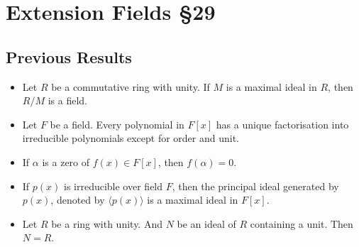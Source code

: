 



\section{Extension Fields \S29}
\subsection*{Previous Results}
\begin{itemize}
	\item Let $R$ be a commutative ring with unity. If $M$ is a maximal ideal in $R$, then $R/M$ is a field. \cite[\S27.9]{fraleigh}
	\item Let $F$ be a field. Every polynomial in $F[x]$ has a unique factorisation into irreducible polynomials except for order and unit.\cite[\S27.27]{fraleigh}
	\item If $\alpha$ is a zero of $f(x) \in F[x]$, then $f(\alpha) = 0$.\cite[\S22.10]{fraleigh}
	\item If $p(x)$ is irreducible over field $F$, then the principal ideal generated by $p(x)$, denoted by $\langle p(x) \rangle$ is a maximal ideal in $F[x]$. \cite[\S27.25]{fraleigh}
	\item Let $R$ be a ring with unity. And $N$ be an ideal of $R$ containing a unit. Then $N = R$.\cite[\S27.5]{fraleigh}
\end{itemize}

